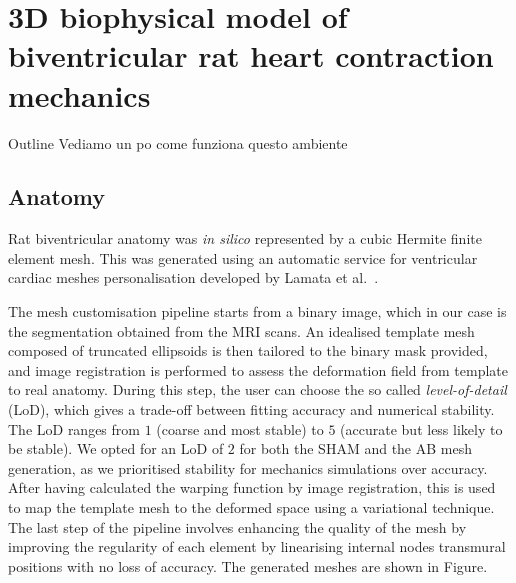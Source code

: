 \chapter{3D biophysical model of biventricular rat heart contraction 
mechanics}\label{cha:chapter2}
%
%
%
\begin{remark}{Outline}
    Vediamo un po come funziona questo ambiente
\end{remark}

%
%
%
\section{Anatomy}
Rat biventricular anatomy was \textit{in silico} represented by a cubic Hermite finite element mesh. This was generated using an automatic service for ventricular cardiac meshes personalisation developed by Lamata et al.~\cite{Lamata:2011, Lamata:2014}.

\vspace{0.2cm}
The mesh customisation pipeline starts from a binary image, which in our case is the segmentation obtained from the MRI scans. An idealised template mesh composed of truncated ellipsoids is then tailored to the binary mask provided, and image registration is performed to assess the deformation field from template to real anatomy. During this step, the user can choose the so called \textit{level-of-detail} (LoD), which gives a trade-off between fitting accuracy and numerical stability. The LoD ranges from $1$ (coarse and most stable) to $5$ (accurate but less likely to be stable). We opted for an LoD of $2$ for both the SHAM and the AB mesh generation, as we prioritised stability for mechanics simulations over accuracy. After having calculated the warping function by image registration, this is used to map the template mesh to the deformed space using a variational technique. The last step of the pipeline involves enhancing the quality of the mesh by improving the regularity of each element by linearising internal nodes transmural positions with no loss of accuracy. The generated meshes are shown in Figure.


